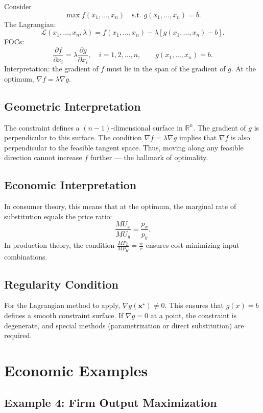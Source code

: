 \documentclass[12pt]{article}
\newcommand{\R}{\mathbb{R}}
\newcommand{\grad}{\nabla}
\newcommand{\ve}[1]{\boldsymbol{#1}}
\newcommand{\Lag}{\mathcal{L}}
\begin{document}
Consider
\[
\max f(x_1, \dots, x_n) \quad \text{s.t. } g(x_1, \dots, x_n) = b.
\]
The Lagrangian:
\[
\Lag(x_1, \dots, x_n, \lambda) = f(x_1, \dots, x_n) - \lambda [g(x_1, \dots, x_n) - b].
\]
FOCs:
\[
\frac{\partial f}{\partial x_i} = \lambda \frac{\partial g}{\partial x_i}, \quad i=1,2,\dots,n, \qquad g(x_1, \dots, x_n) = b.
\]
Interpretation: the gradient of \( f \) must lie in the span of the gradient of \( g \). At the optimum, \( \grad f = \lambda \grad g \).

\subsection*{Geometric Interpretation}

The constraint defines a $(n-1)$-dimensional surface in $\R^n$. The gradient of $g$ is perpendicular to this surface. The condition $\grad f = \lambda \grad g$ implies that $\grad f$ is also perpendicular to the feasible tangent space. Thus, moving along any feasible direction cannot increase $f$ further — the hallmark of optimality.

\subsection*{Economic Interpretation}

In consumer theory, this means that at the optimum, the marginal rate of substitution equals the price ratio:
\[
\frac{MU_x}{MU_y} = \frac{p_x}{p_y}.
\]
In production theory, the condition $\frac{MP_L}{MP_K} = \frac{w}{r}$ ensures cost-minimizing input combinations.

\subsection*{Regularity Condition}

For the Lagrangian method to apply, $\grad g(\ve{x}^\star) \neq 0$. This ensures that $g(x)=b$ defines a smooth constraint surface. If $\grad g = 0$ at a point, the constraint is degenerate, and special methods (parametrization or direct substitution) are required.

\section*{Economic Examples}

\subsection*{Example 4: Firm Output Maximization}
\end{document}

